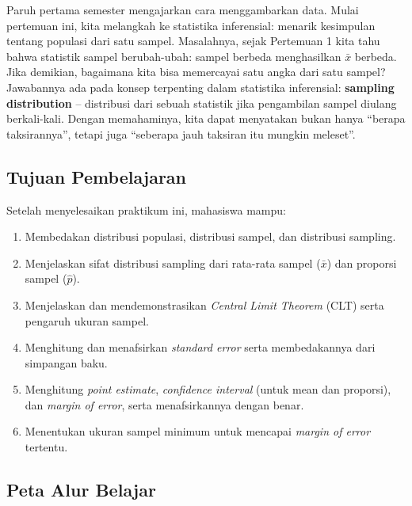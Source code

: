 \documentclass[
  indonesian,
  letterpaper,
]{book}
\providecommand{\tightlist}{%
  \setlength{\itemsep}{0pt}\setlength{\parskip}{0pt}}
\begin{document}
Paruh pertama semester mengajarkan cara menggambarkan data. Mulai
pertemuan ini, kita melangkah ke statistika inferensial: menarik
kesimpulan tentang populasi dari satu sampel. Masalahnya, sejak
Pertemuan 1 kita tahu bahwa statistik sampel berubah-ubah: sampel
berbeda menghasilkan \(\bar{x}\) berbeda. Jika demikian, bagaimana kita
bisa memercayai satu angka dari satu sampel? Jawabannya ada pada konsep
terpenting dalam statistika inferensial: \textbf{sampling distribution}
-- distribusi dari sebuah statistik jika pengambilan sampel diulang
berkali-kali. Dengan memahaminya, kita dapat menyatakan bukan hanya
``berapa taksirannya'', tetapi juga ``seberapa jauh taksiran itu mungkin
meleset''.

\subsection{Tujuan Pembelajaran}\label{tujuan-pembelajaran}

Setelah menyelesaikan praktikum ini, mahasiswa mampu:

\begin{enumerate}
\def\labelenumi{\arabic{enumi}.}
\tightlist
\item
  Membedakan distribusi populasi, distribusi sampel, dan distribusi
  sampling.
\item
  Menjelaskan sifat distribusi sampling dari rata-rata sampel
  (\(\bar{x}\)) dan proporsi sampel (\(\hat{p}\)).
\item
  Menjelaskan dan mendemonstrasikan \emph{Central Limit Theorem} (CLT)
  serta pengaruh ukuran sampel.
\item
  Menghitung dan menafsirkan \emph{standard error} serta membedakannya
  dari simpangan baku.
\item
  Menghitung \emph{point estimate}, \emph{confidence interval} (untuk
  mean dan proporsi), dan \emph{margin of error}, serta menafsirkannya
  dengan benar.
\item
  Menentukan ukuran sampel minimum untuk mencapai \emph{margin of error}
  tertentu.
\end{enumerate}

\subsection{Peta Alur Belajar}\label{peta-alur-belajar}
\end{document}
